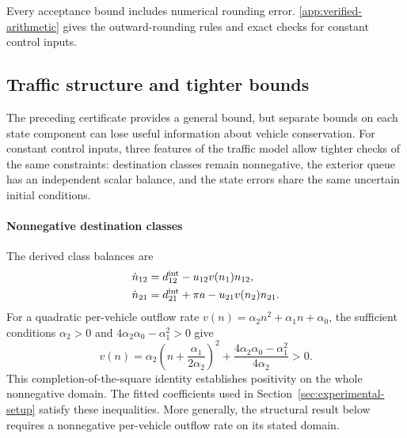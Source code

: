 \documentclass[preprint,12pt]{elsarticle}
\theoremstyle{definition}
\theoremstyle{plain}
\theoremstyle{definition}
\theoremstyle{plain}
\newcommand{\appref}[1]{\ref{#1}}
\begin{document}
Every acceptance bound includes numerical rounding error.
\appref{app:verified-arithmetic} gives the outward-rounding rules and
exact checks for constant control inputs.

\subsection{Traffic structure and tighter bounds}
\label{sec:structure-certificate}
\label{app:structure-proof}

The preceding certificate provides a general bound, but separate bounds
on each state component can lose useful information about vehicle
conservation. For constant control inputs, three features of the traffic model
allow tighter checks of the same constraints: destination classes remain
nonnegative, the exterior queue has an independent scalar balance, and
the state errors share the same uncertain initial conditions.

\paragraph{Nonnegative destination classes}
The derived class balances are
\begin{equation}
 \begin{aligned}
 \dot n_{12}&=d^{\rm int}_{12}-u_{12}v(n_1)n_{12},\\
 \dot n_{21}&=d^{\rm int}_{21}+\pi a-u_{21}v(n_2)n_{21}.
 \end{aligned}
 \label{eq:structure-derived-classes}
\end{equation}
For a quadratic per-vehicle outflow rate
$v(n)=\alpha_2n^2+\alpha_1n+\alpha_0$, the sufficient conditions
$\alpha_2>0$ and $4\alpha_2\alpha_0-\alpha_1^2>0$ give
\begin{equation}
 v(n)=\alpha_2\left(n+\frac{\alpha_1}{2\alpha_2}\right)^2+
                    \frac{4\alpha_2\alpha_0-\alpha_1^2}{4\alpha_2}>0.
 \label{eq:structure-positive-factor}
\end{equation}
This completion-of-the-square identity establishes positivity on the
whole nonnegative domain. The fitted coefficients used in
Section~\ref{sec:experimental-setup} satisfy these inequalities.
More generally, the structural result below requires a nonnegative
per-vehicle outflow rate on its stated domain.
\end{document}
